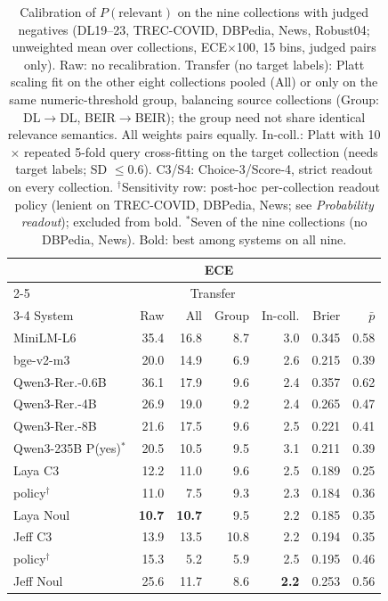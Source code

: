\begin{table}[t]
\centering
\footnotesize
\setlength{\tabcolsep}{1.6pt}
\caption{Calibration of $P(\text{relevant})$ on the nine collections with judged negatives (DL19--23, TREC-COVID, DBPedia, News, Robust04; unweighted mean over collections, ECE$\times$100, 15 bins, judged pairs only). Raw: no recalibration. Transfer (no target labels): Platt scaling fit on the other eight collections pooled (All) or only on the same numeric-threshold group, balancing source collections (Group: DL$\to$DL, BEIR$\to$BEIR); the group need not share identical relevance semantics. All weights pairs equally. In-coll.: Platt with 10$\times$ repeated 5-fold query cross-fitting on the target collection (needs target labels; SD $\le$0.6). C3/S4: Choice-3/Score-4, strict readout on every collection. $^\dagger$Sensitivity row: post-hoc per-collection readout policy (lenient on TREC-COVID, DBPedia, News; see \emph{Probability readout}); excluded from bold. $^\ast$Seven of the nine collections (no DBPedia, News). Bold: best among systems on all nine.}
\label{tab:calibration}
\begin{tabular}{lrrrrrr}
\toprule
 & \multicolumn{4}{c}{ECE} & & \\ \cmidrule(lr){2-5}
 & & \multicolumn{2}{c}{Transfer} & & & \\ \cmidrule(lr){3-4}
System & Raw & All & Group & In-coll. & Brier & $\bar{p}$ \\
\midrule
MiniLM-L6 & 35.4 & 16.8 & 8.7 & 3.0 & 0.345 & 0.58 \\
bge-v2-m3 & 20.0 & 14.9 & 6.9 & 2.6 & 0.215 & 0.39 \\
Qwen3-Rer.-0.6B & 36.1 & 17.9 & 9.6 & 2.4 & 0.357 & 0.62 \\
Qwen3-Rer.-4B & 26.9 & 19.0 & 9.2 & 2.4 & 0.265 & 0.47 \\
Qwen3-Rer.-8B & 21.6 & 17.5 & 9.6 & 2.5 & 0.221 & 0.41 \\
Qwen3-235B P(yes)$^\ast$ & 20.5 & 10.5 & 9.5 & 3.1 & 0.211 & 0.39 \\
Laya C3 & 12.2 & 11.0 & 9.6 & 2.5 & 0.189 & 0.25 \\
\quad policy$^\dagger$ & 11.0 & 7.5 & 9.3 & 2.3 & 0.184 & 0.36 \\
Laya Noul & \textbf{10.7} & \textbf{10.7} & 9.5 & 2.2 & 0.185 & 0.35 \\
Jeff C3 & 13.9 & 13.5 & 10.8 & 2.2 & 0.194 & 0.35 \\
\quad policy$^\dagger$ & 15.3 & 5.2 & 5.9 & 2.5 & 0.195 & 0.46 \\
Jeff Noul & 25.6 & 11.7 & 8.6 & \textbf{2.2} & 0.253 & 0.56 \\

\end{tabular}
\end{table}
